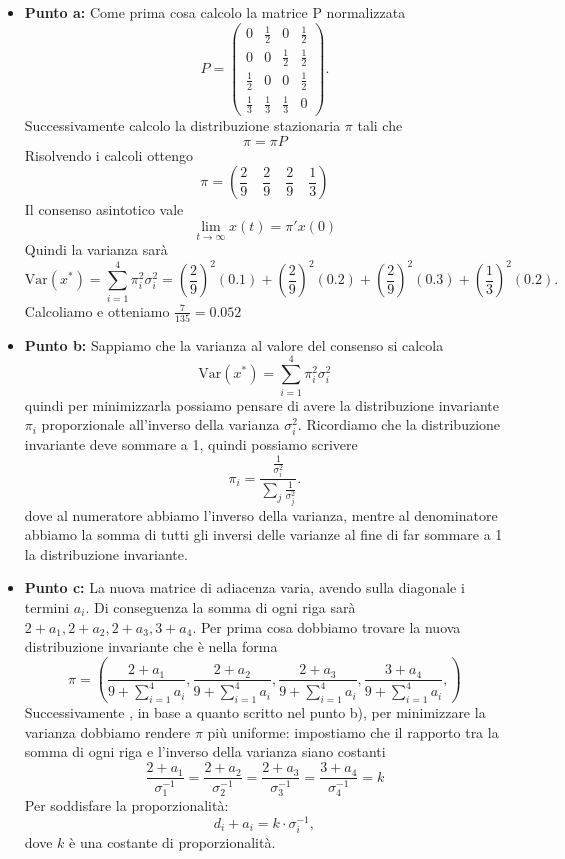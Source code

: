 \documentclass[a4paper,12pt]{article}
\begin{document}
	\begin{itemize}
		\item \textbf{Punto a: }
		Come prima cosa calcolo la matrice P normalizzata\\
		\[
		P = \begin{pmatrix}
			0 & \frac{1}{2} & 0 & \frac{1}{2} \\
			0 & 0 & \frac{1}{2} & \frac{1}{2} \\
			\frac{1}{2} & 0 & 0 & \frac{1}{2} \\
			\frac{1}{3} & \frac{1}{3} & \frac{1}{3} & 0
		\end{pmatrix}.
		\]
		Successivamente calcolo la distribuzione stazionaria $\pi$ tali che \\
		\[
		\pi = \pi P
		\]
		Risolvendo i calcoli ottengo\\
		\[
		\pi = \left( \frac{2}{9} \quad \frac{2}{9} \quad \frac{2}{9} \quad \frac{1}{3} \right)
		\]
		Il consenso asintotico vale\\
		\[
		\lim_{t \to \infty} x(t) = \pi' x(0)
		\]
		Quindi la varianza sarà\\
		\[
		\text{Var}(x^*) = \sum_{i=1}^4 \pi_i^2 \sigma_i^2 
		= \left( \frac{2}{9} \right)^2 (0.1) 
		+ \left( \frac{2}{9} \right)^2 (0.2) 
		+ \left( \frac{2}{9} \right)^2 (0.3) 
		+ \left( \frac{1}{3} \right)^2 (0.2).
		\]
		Calcoliamo e otteniamo $\frac{7}{135} = 0.052$
		\item \textbf{Punto b: }
		Sappiamo che la varianza al valore del consenso si calcola\\
		\[
			\text{Var}(x^*) = \sum_{i=1}^4 \pi_i^2 \sigma_i^2 
		\]
		quindi per minimizzarla possiamo pensare di avere la distribuzione invariante $\pi_i$ proporzionale all'inverso della varianza $\sigma_i^2$.
		Ricordiamo che la distribuzione invariante deve sommare a 1, quindi possiamo scrivere\\
		\[
		\pi_i = \frac{\frac{1}{\sigma_i^2}}{\sum_j \frac{1}{\sigma_j^2}}.
		\]
		dove al numeratore abbiamo l'inverso della varianza, mentre al denominatore abbiamo la somma di tutti gli inversi delle varianze al fine di far sommare a 1 la distribuzione invariante.
		\item \textbf{Punto c: }
		La nuova matrice di adiacenza varia, avendo sulla diagonale i termini $a_i$. Di conseguenza la somma di ogni riga sarà $2+a_1, 2+a_2, 2+a_3, 3+a_4$. Per prima cosa dobbiamo trovare la nuova distribuzione invariante che è nella forma\\
		\[
		\pi=(\frac{2+a_1}{9+\sum_{i=1}^4 a_i},\frac{2+a_2}{9+\sum_{i=1}^4 a_i},\frac{2+a_3}{9+\sum_{i=1}^4 a_i},\frac{3+a_4}{9+\sum_{i=1}^4 a_i},)
		\]
		Successivamente , in base a quanto scritto nel punto b), per minimizzare la varianza dobbiamo rendere $\pi$ più uniforme: impostiamo che il rapporto tra la somma di ogni riga e l'inverso della varianza siano costanti\\
		\[
		\frac{2+a_1}{\sigma_1^{-1}}=\frac{2+a_2}{\sigma_2^{-1}}=\frac{2+a_3}{\sigma_3^{-1}}=\frac{3+a_4}{\sigma_4^{-1}}=k
		\]
		Per soddisfare la proporzionalità:
		\[
		d_i + a_i = k \cdot \sigma_i^{-1},
		\]
		dove \(k\) è una costante di proporzionalità.
		

\end{itemize}
\end{document}
